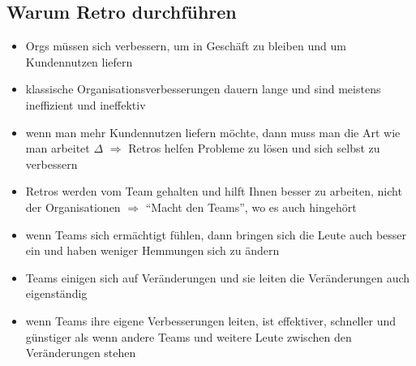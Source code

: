 \subsection{Warum Retro durchführen}
\begin{itemize}
  \item Orgs müssen sich verbessern, um in Geschäft zu bleiben und um Kundennutzen
    liefern
  \item klassische Organisationsverbesserungen dauern lange und sind meistens ineffizient und
    ineffektiv
  \item wenn man mehr Kundennutzen liefern möchte, dann muss man die Art wie man arbeitet
    $\Delta$ $\Rightarrow$  Retros helfen Probleme zu lösen und sich selbst zu verbessern
  \item Retros werden vom Team gehalten und hilft Ihnen besser zu arbeiten, nicht der
    Organisationen $\Rightarrow$ \enquote{Macht den Teams}, wo es auch hingehört
  \item wenn Teams sich ermächtigt fühlen, dann bringen sich die Leute auch besser ein und haben weniger Hemmungen sich zu ändern
  \item Teams einigen sich auf Veränderungen und sie leiten die Veränderungen auch eigenständig
  \item wenn Teams ihre eigene Verbesserungen leiten, ist effektiver, schneller und günstiger als
    wenn andere Teams und weitere Leute zwischen den Veränderungen stehen
\end{itemize}


